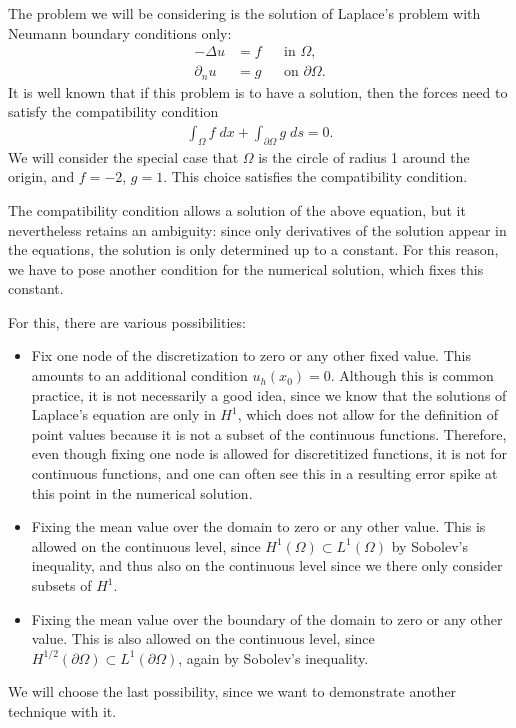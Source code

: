 \documentclass{article}
\begin{document}
The problem we will be considering is the solution of Laplace's problem with
Neumann boundary conditions only:
\begin{align*}
  -\Delta u &= f  &&\text{in $\Omega$},
  \\
  \partial_n u &= g && \text{on $\partial\Omega$}.
\end{align*}
It is well known that if this problem is to have a solution, then the forces
need to satisfy the compatibility condition
\begin{gather*}
  \int_\Omega f\; dx + \int_{\partial\Omega} g\; ds = 0.
\end{gather*}
We will consider the special case that $\Omega$ is the circle of radius 1
around the origin, and $f=-2$, $g=1$. This choice satisfies the compatibility
condition.

The compatibility condition allows a solution of the above equation, but it
nevertheless retains an ambiguity: since only derivatives of the solution
appear in the equations, the solution is only determined up to a constant. For
this reason, we have to pose another condition for the numerical solution,
which fixes this constant. 

For this, there are various possibilities:
\begin{itemize}
\item Fix one node of the discretization to zero or any other fixed value.
  This amounts to an additional condition $u_h(x_0)=0$. Although this is
  common practice, it is not necessarily a good idea, since we know that the
  solutions of Laplace's equation are only in $H^1$, which does not allow for
  the definition of point values because it is not a subset of the continuous
  functions. Therefore, even though fixing one node is allowed for
  discretitized functions, it is not for continuous functions, and one can
  often see this in a resulting error spike at this point in the numerical
  solution. 
  
\item Fixing the mean value over the domain to zero or any other value. This
  is allowed on the continuous level, since $H^1(\Omega)\subset L^1(\Omega)$
  by Sobolev's inequality, and thus also on the continuous level since we
  there only consider subsets of $H^1$.
  
\item Fixing the mean value over the boundary of the domain to zero or any
  other value. This is also allowed on the continuous level, since
  $H^{1/2}(\partial\Omega)\subset L^1(\partial\Omega)$, again by Sobolev's
  inequality.
\end{itemize}
We will choose the last possibility, since we want to demonstrate another
technique with it.
\end{document}
